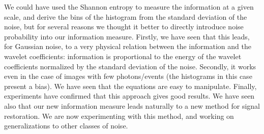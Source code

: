 \documentclass[11pt,a4paper]{article}
\begin{document}
We could
have used the Shannon entropy to measure the information at a given scale,
and derive the bins of the histogram from the standard deviation of the noise,
but for several reasons we thought it better to directly introduce 
noise probability into our information measure. 
Firstly, we have seen that this leads, for Gaussian noise, to
a very physical relation between the information and the wavelet coefficients:
information is proportional to the energy of the wavelet coefficients
normalized by the standard deviation of the noise. 
Secondly, it works even in the case
of images with few photons/events (the histograms in this case present a bias).
We have seen that the equations are easy to manipulate. 
Finally, experiments have 
confirmed that this approach gives good results.
We have seen also that our new information
measure leads naturally to a new method for signal restoration. 
We are now experimenting with this method, and working on generalizations to
other classes of noise.

\newpage


\end{document}
